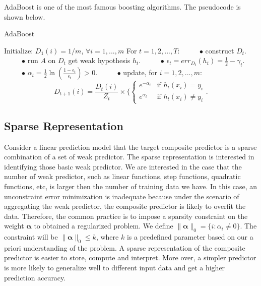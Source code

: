 \documentclass{article} %
\begin{document}
AdaBoost is one of the most famous boosting algorithms. The pseudocode is shown below.
\begin{algorithm}[H]
\caption{AdaBoost}
 \SetAlgoLined

    \BlankLine
  Initialize: $D_1(i) =1/m$, $\forall i=1,...,m$
  \BlankLine
  For $t=1,2,...,T$:  \BlankLine
      ~~~~~$\bullet$ construct $D_t$.  \BlankLine
      ~~~~~$\bullet$  run $A$ on $D_t$ get weak hypothesis $h_t$.  \BlankLine
      ~~~~~$\bullet$  $\epsilon_t=err_{D_t}(h_t)=\frac{1}{2}-\gamma_t$. \BlankLine
      ~~~~~$\bullet$  $\alpha_t=\frac{1}{2}\ln(\frac{1-\epsilon_t}{\epsilon_t}) > 0$.  \BlankLine
      ~~~~~$\bullet$  update, for $i=1,2,...,m$:
               $$ D_{t+1}(i)=\frac{D_t(i)}{Z_t} \times  \{
    						 \begin{cases}
     						 e^{-\alpha_t} &\text{if } h_t(x_i)=y_i\\
     						 e^{\alpha_t}   &\text{if }   h_t(x_i) \neq  y_i
   						 \end{cases} .$$ \BlankLine
{}
\end{algorithm}


\subsection{Sparse Representation}
Consider a linear prediction model that the target composite predictor is a sparse combination of a set of weak predictor. The sparse representation is interested in identifying those basic weak predictor. We are interested in the case that the number of weak predictor, such as linear functions, step functions, quadratic functions, etc, is larger then the number of training data we have. In this case, an unconstraint error minimization is inadequate because under the scenario of aggregating the weak predictor, the composite predictor is likely to overfit the data. Therefore, the common practice is to impose a sparsity constraint on the weight $\boldsymbol\alpha$ to obtained a regularized problem. We define $\| \boldsymbol\alpha \|_0=\{i:\alpha_i\neq0 \}$. The constraint will be $\| \boldsymbol\alpha \|_0\leq k$, where $k$ is a predefined parameter based on our a priori understanding of the problem. A sparse representation of the composite predictor is easier to store, compute and interpret. More over,  a simpler predictor is more likely to generalize well to different input data and get a higher prediction accuracy.
\end{document}
